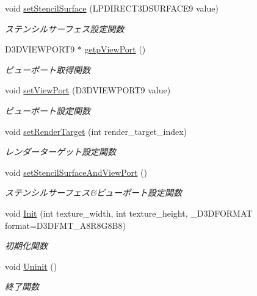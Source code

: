 \begin{DoxyCompactItemize}
void \mbox{\hyperlink{class_render_texture_a90dc1e935f2d501b7464530b9ab913c0}{set\+Stencil\+Surface}} (L\+P\+D\+I\+R\+E\+C\+T3\+D\+S\+U\+R\+F\+A\+C\+E9 value)
\begin{DoxyCompactList}\small\item\em ステンシルサーフェス設定関数 \end{DoxyCompactList}\item 
D3\+D\+V\+I\+E\+W\+P\+O\+R\+T9 $\ast$ \mbox{\hyperlink{class_render_texture_a329c2c45fcfe260ec00215a6341a4d6d}{getp\+View\+Port}} ()
\begin{DoxyCompactList}\small\item\em ビューポート取得関数 \end{DoxyCompactList}\item 
void \mbox{\hyperlink{class_render_texture_aef70e6af97e99bed0f8fc535aa6bce77}{set\+View\+Port}} (D3\+D\+V\+I\+E\+W\+P\+O\+R\+T9 value)
\begin{DoxyCompactList}\small\item\em ビューポート設定関数 \end{DoxyCompactList}\item 
void \mbox{\hyperlink{class_render_texture_ad231f9b5bda67acf63cf0a20e09f474e}{set\+Render\+Target}} (int render\+\_\+target\+\_\+index)
\begin{DoxyCompactList}\small\item\em レンダーターゲット設定関数 \end{DoxyCompactList}\item 
void \mbox{\hyperlink{class_render_texture_a9cbf3bd5433bf2a3a0b56134ac460b3d}{set\+Stencil\+Surface\+And\+View\+Port}} ()
\begin{DoxyCompactList}\small\item\em ステンシルサーフェス\&ビューポート設定関数 \end{DoxyCompactList}\item 
void \mbox{\hyperlink{class_render_texture_a4f9b6c0ff0a336387d6a453206b04a9c}{Init}} (int texture\+\_\+width, int texture\+\_\+height, \+\_\+\+D3\+D\+F\+O\+R\+M\+AT format=D3\+D\+F\+M\+T\+\_\+\+A8\+R8\+G8\+B8)
\begin{DoxyCompactList}\small\item\em 初期化関数 \end{DoxyCompactList}\item 
void \mbox{\hyperlink{class_render_texture_a667858837eaff299a71c184ba4a7e358}{Uninit}} ()
\begin{DoxyCompactList}\small\item\em 終了関数 \end{DoxyCompactList}\end{DoxyCompactItemize}
